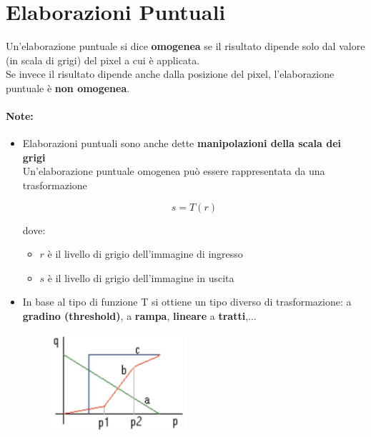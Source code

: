 \section{Elaborazioni Puntuali}

\begin{definition}
    Un'elaborazione puntuale si dice \textbf{omogenea} se il risultato dipende
    solo dal valore (in scala di grigi) del pixel a cui è applicata.\\
    Se invece il risultato dipende anche dalla posizione del pixel,
    l'elaborazione puntuale è \textbf{non omogenea}.
\end{definition}

\paragraph{Note:}

\begin{itemize}
    \item Elaborazioni puntuali sono anche dette \textbf{manipolazioni della
              scala dei grigi}\\
          Un'elaborazione puntuale omogenea può essere rappresentata da una
          trasformazione

          $$
              s = T(r)
          $$

          dove:
          \begin{itemize}
              \item $r$ è il livello di grigio dell'immagine di ingresso
              \item $s$ è il livello di grigio dell'immagine in uscita
          \end{itemize}
    \item In base al tipo di funzione T si ottiene un tipo diverso di
          trasformazione: a \textbf{gradino (threshold)}, a \textbf{rampa},
          \textbf{lineare} a \textbf{tratti},...

          \begin{figure}[H]
              \centering
              \includegraphics[width=5cm, keepaspectratio]{capitoli/immagini/imgs/elaborazioni_puntuali_immagine.jpg}
          \end{figure}

\end{itemize}

